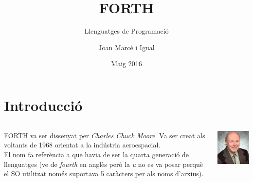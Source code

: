 \documentclass{beamer}
\title{FORTH}
\subtitle{Llenguatges de Programació}
\author{Joan Marcè i Igual}
\institute[UPC]{Universitat Politècnica de Catalunya}
\date{Maig 2016}
\begin{document}
\frame{\titlepage}

\section{Introducció}

\begin{frame}
    \begin{columns}[c]
        \begin{column}{0.5\linewidth}
            FORTH va ser dissenyat per \emph{Charles Chuck Moore}. Va ser creat als voltants de 1968 orientat a la indústria aeroespacial. \\
            \pause
            El nom fa referència a que havia de ser la quarta generació de llenguatges
            (ve de \emph{fourth} en anglès però la \emph{u} no es va posar perquè el SO utilitzat només suportava 5 caràcters per als noms d'arxius).
        \end{column}
        \begin{column}{0.5\linewidth}
            \onslide\includegraphics[height=0.5\textheight]{charles}    
        \end{column}

    \end{columns}
\end{frame}
\end{document}
